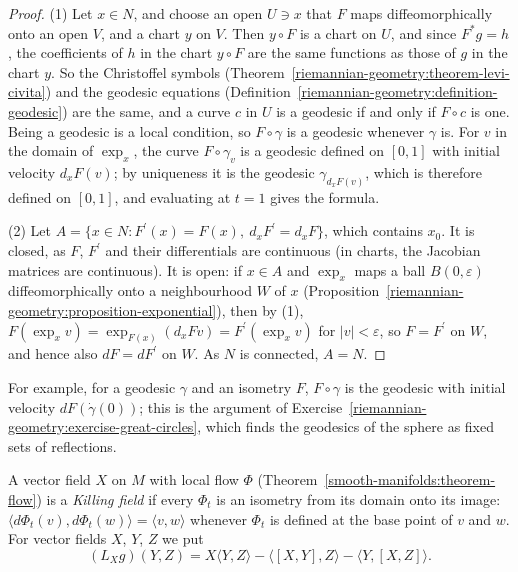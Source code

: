 \begin{proof}
(1) Let $x \in N$, and choose an open $U \ni x$ that $F$ maps diffeomorphically onto an open $V$, and a chart $y$ on $V$. Then $y \circ F$ is a chart on $U$, and
since $F^*g = h$, the coefficients of $h$ in the chart $y \circ F$ are the same functions as those of $g$ in the chart $y$. So the Christoffel symbols
(Theorem~\ref{riemannian-geometry:theorem-levi-civita}) and the geodesic equations (Definition~\ref{riemannian-geometry:definition-geodesic}) are the same, and a curve
$c$ in $U$ is a geodesic if and only if $F \circ c$ is one. Being a geodesic is a local condition, so $F \circ \gamma$ is a geodesic whenever $\gamma$ is. For $v$ in the
domain of $\exp_x$, the curve $F \circ \gamma_v$ is a geodesic defined on $[0, 1]$ with initial velocity $d_xF(v)$; by uniqueness it is the geodesic
$\gamma_{d_xF(v)}$, which is therefore defined on $[0, 1]$, and evaluating at $t = 1$ gives the formula.

(2) Let $A = \{x \in N : F^{\prime}(x) = F(x),\ d_xF^{\prime} = d_xF\}$, which contains $x_0$. It is closed, as $F$, $F^{\prime}$ and their differentials are continuous (in charts,
the Jacobian matrices are continuous). It is open: if $x \in A$ and $\exp_x$ maps a ball $B(0, \varepsilon)$ diffeomorphically onto a neighbourhood $W$ of $x$
(Proposition~\ref{riemannian-geometry:proposition-exponential}), then by (1), $F(\exp_x v) = \exp_{F(x)}(d_xFv) = F^{\prime}(\exp_x v)$ for $|v| < \varepsilon$, so
$F = F^{\prime}$ on $W$, and hence also $dF = dF^{\prime}$ on $W$. As $N$ is connected, $A = N$.
\end{proof}

For example, for a geodesic $\gamma$ and an isometry $F$, $F \circ \gamma$ is the geodesic with initial velocity $dF(\dot\gamma(0))$; this is the argument of
Exercise~\ref{riemannian-geometry:exercise-great-circles}, which finds the geodesics of the sphere as fixed sets of reflections.

\begin{definition}\label{riemannian-geometry:definition-killing}
A vector field $X$ on $M$ with local flow $\Phi$ (Theorem~\ref{smooth-manifolds:theorem-flow}) is a \emph{Killing field} if every $\Phi_t$ is an isometry from its
domain onto its image: $\langle d\Phi_t(v), d\Phi_t(w)\rangle = \langle v, w\rangle$ whenever $\Phi_t$ is defined at the base point of $v$ and $w$. For vector fields
$X$, $Y$, $Z$ we put
\[
(L_Xg)(Y, Z) = X\langle Y, Z\rangle - \langle[X, Y], Z\rangle - \langle Y, [X, Z]\rangle .
\]
\end{definition}

